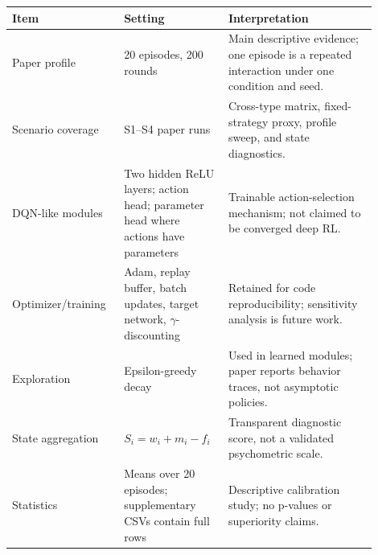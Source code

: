 \begin{tabular}{p{0.26\linewidth}p{0.26\linewidth}p{0.38\linewidth}}
\toprule
Item & Setting & Interpretation \\
\midrule
Paper profile & 20 episodes, 200 rounds & Main descriptive evidence; one episode is a repeated interaction under one condition and seed. \\
Scenario coverage & S1--S4 paper runs & Cross-type matrix, fixed-strategy proxy, profile sweep, and state diagnostics. \\
DQN-like modules & Two hidden ReLU layers; action head; parameter head where actions have parameters & Trainable action-selection mechanism; not claimed to be converged deep RL. \\
Optimizer/training & Adam, replay buffer, batch updates, target network, $\gamma$-discounting & Retained for code reproducibility; sensitivity analysis is future work. \\
Exploration & Epsilon-greedy decay & Used in learned modules; paper reports behavior traces, not asymptotic policies. \\
State aggregation & $S_i=w_i+m_i-f_i$ & Transparent diagnostic score, not a validated psychometric scale. \\
Statistics & Means over 20 episodes; supplementary CSVs contain full rows & Descriptive calibration study; no p-values or superiority claims. \\
\bottomrule
\end{tabular}

